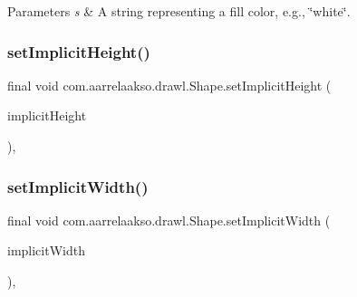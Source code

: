 \begin{DoxyParams}{Parameters}
{\em s} & A string representing a fill color, e.\+g., \char`\"{}white\char`\"{}. \\
\hline
\end{DoxyParams}
\mbox{\label{classcom_1_1aarrelaakso_1_1drawl_1_1_shape_ad41ecfc8ce74638066d8a21c97e3f399}} 
\subsubsection{\texorpdfstring{set\+Implicit\+Height()}{setImplicitHeight()}}
{\footnotesize\ttfamily final void com.\+aarrelaakso.\+drawl.\+Shape.\+set\+Implicit\+Height (\begin{DoxyParamCaption}\item[{\hyperlink{classcom_1_1aarrelaakso_1_1drawl_1_1_sisu_big_decimal}{Sisu\+Big\+Decimal}}]{implicit\+Height }\end{DoxyParamCaption})\hspace{0.3cm}{\ttfamily [protected]}, {\ttfamily [inherited]}}

\mbox{\label{classcom_1_1aarrelaakso_1_1drawl_1_1_shape_a6ec4c2bd26d08f0a1545bd1d5f47c05a}} 
\subsubsection{\texorpdfstring{set\+Implicit\+Width()}{setImplicitWidth()}}
{\footnotesize\ttfamily final void com.\+aarrelaakso.\+drawl.\+Shape.\+set\+Implicit\+Width (\begin{DoxyParamCaption}\item[{\hyperlink{classcom_1_1aarrelaakso_1_1drawl_1_1_sisu_big_decimal}{Sisu\+Big\+Decimal}}]{implicit\+Width }\end{DoxyParamCaption})\hspace{0.3cm}{\ttfamily [protected]}, {\ttfamily [inherited]}}

